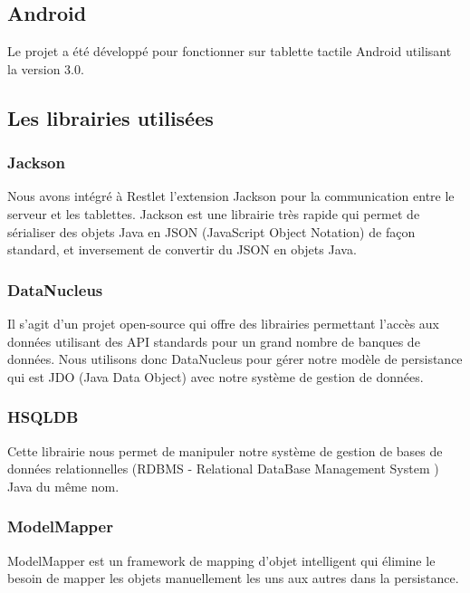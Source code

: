 \documentclass{article}
\begin{document}
\subsection{Android}

Le projet a été développé pour fonctionner sur tablette tactile Android utilisant la version 3.0. 


\subsection{Les librairies utilisées}

\subsubsection{Jackson}

Nous avons intégré à Restlet l'extension Jackson pour la communication entre le serveur et les tablettes. Jackson est une librairie très rapide qui permet de sérialiser des objets Java en JSON (JavaScript Object Notation) de façon standard, et inversement de convertir du JSON en objets Java.

\subsubsection{DataNucleus}

Il s’agit d’un projet open-source qui offre des librairies permettant l'accès aux données utilisant des API standards pour un grand nombre de banques de données. Nous utilisons donc DataNucleus pour gérer notre modèle de persistance qui est JDO (Java Data Object) avec notre système de gestion de données.

\subsubsection{HSQLDB}

Cette librairie nous permet de manipuler notre système de gestion de bases de données     relationnelles (RDBMS - Relational DataBase Management System ) Java du même nom.    

\subsubsection{ModelMapper}

ModelMapper est un framework de mapping d'objet intelligent qui élimine le besoin de mapper les objets manuellement les uns aux autres dans la persistance.    
\end{document}
